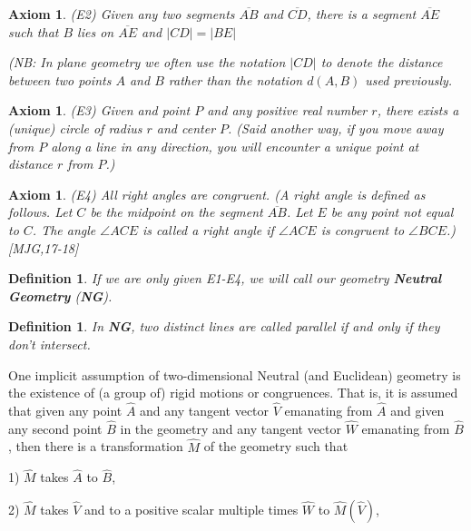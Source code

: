 \documentclass{article}%
\newtheorem{axiom}[theorem]{Axiom}
\newtheorem{definition}[theorem]{Definition}
\begin{document}
\begin{axiom}
(E2) Given any two segments $\overline{AB}$ and $\overline{CD}$, there is a
segment $\overline{AE}$ such that $B$ lies on $\overline{AE}$ and $\left\vert
CD\right\vert =\left\vert BE\right\vert $

(NB: In plane geometry we often use the notation $\left\vert CD\right\vert $
to denote the distance between two points $A$ and $B$ rather than the notation
$d\left(  A,B\right)  $ used previously.
\end{axiom}

\begin{axiom}
(E3) Given and point $P$ and any positive real number $r$, there exists a
(unique) circle of radius $r$ and center $P$. (Said another way, if you move
away from $P$ along a line in any direction, you will encounter a unique point
at distance $r$ from $P$.)
\end{axiom}

\begin{axiom}
(E4) All right angles are congruent. (A right angle is defined as follows. Let
$C$ be the midpoint on the segment $\overline{AB}$. Let $E$ be any point not
equal to $C$. The angle $\angle ACE$ is called a right angle if $\angle ACE$
is congruent to $\angle BCE$.) [MJG,17-18]
\end{axiom}

\begin{definition}
If we are only given E1-E4, we will call our geometry \textbf{Neutral
Geometry} (\textbf{NG}).
\end{definition}

\begin{definition}
In \textbf{NG}, two distinct lines are called parallel if and only if they
don't intersect.
\end{definition}

One implicit assumption of two-dimensional Neutral (and Euclidean) geometry is
the existence of (a group of) rigid motions or congruences. That is, it is
assumed that given any point $\hat{A}$ and any tangent vector $\hat{V}$
emanating from $\hat{A}$ and given any second point $\hat{B}$ in the geometry
and any tangent vector $\hat{W}$ emanating from $\hat{B}$, then there is a
transformation $\hat{M}$ of the geometry such that

1) $\hat{M}$ takes $\hat{A}$ to $\hat{B}$,

2) $\hat{M}$ takes $\hat{V}$ and to a positive scalar multiple times $\hat{W}$
to $\hat{M}\left(  \hat{V}\right)  $,
\end{document}
